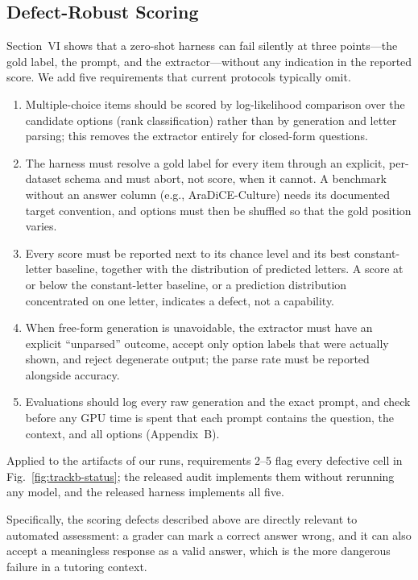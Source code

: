 \subsection{Defect-Robust Scoring}
Section~VI shows that a zero-shot harness can fail silently at three points---the gold
label, the prompt, and the extractor---without any indication in the reported score.
We add five requirements that current protocols typically omit.
\begin{enumerate}
  \item Multiple-choice items should be scored by log-likelihood comparison over the
        candidate options (rank classification) rather than by generation and letter
        parsing; this removes the extractor entirely for closed-form questions.
  \item The harness must resolve a gold label for every item through an explicit,
        per-dataset schema and must abort, not score, when it cannot. A benchmark
        without an answer column (e.g., AraDiCE-Culture) needs its documented target
        convention, and options must then be shuffled so that the gold position varies.
  \item Every score must be reported next to its chance level and its best
        constant-letter baseline, together with the distribution of predicted letters.
        A score at or below the constant-letter baseline, or a prediction distribution
        concentrated on one letter, indicates a defect, not a capability.
  \item When free-form generation is unavoidable, the extractor must have an explicit
        ``unparsed'' outcome, accept only option labels that were actually shown, and
        reject degenerate output; the parse rate must be reported alongside accuracy.
  \item Evaluations should log every raw generation and the exact prompt, and check
        before any GPU time is spent that each prompt contains the question, the
        context, and all options (Appendix~B).
\end{enumerate}
Applied to the artifacts of our runs, requirements 2--5 flag every defective cell in
Fig.~\ref{fig:trackb-status}; the released audit implements them without rerunning any
model, and the released harness implements all five.

Specifically, the scoring defects described above are directly relevant to automated
assessment: a grader can mark a correct answer wrong, and it can also accept a
meaningless response as a valid answer, which is the more dangerous failure in a
tutoring context.

